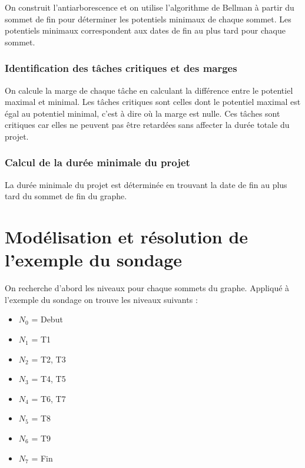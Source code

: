 \documentclass{article}
\begin{document}
On construit l'antiarborescence et on utilise l'algorithme de Bellman à partir du sommet de fin pour déterminer les potentiels minimaux de chaque sommet. Les potentiels minimaux correspondent aux dates de fin au plus tard pour chaque sommet.

\subsubsection{Identification des tâches critiques et des marges}

On calcule la marge de chaque tâche en calculant la différence entre le potentiel maximal et minimal. Les tâches critiques sont celles dont le potentiel maximal est égal au potentiel minimal, c'est à dire où la marge est nulle. Ces tâches sont critiques car elles ne peuvent pas être retardées sans affecter la durée totale du projet.

\subsubsection{Calcul de la durée minimale du projet}

La durée minimale du projet est déterminée en trouvant la date de fin au plus tard du sommet de fin du graphe.

\section{Modélisation et résolution de l'exemple du sondage}

On recherche d'abord les niveaux pour chaque sommets du graphe. Appliqué à l'exemple du sondage on trouve les niveaux suivants :
\begin{itemize}
\item $N_{0}$ = {Debut}

\item $N_{1}$ = {T1}

\item $N_{2}$ = {T2, T3}

\item $N_{3}$ = {T4, T5}

\item $N_{4}$ = {T6, T7}

\item $N_{5}$ = {T8}

\item $N_{6}$ = {T9}

\item $N_{7}$ = {Fin}
\end{itemize}
\end{document}
